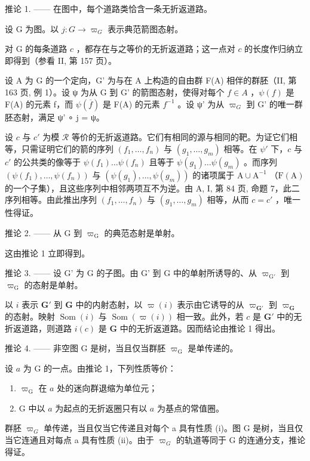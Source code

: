 推论 1. —— 在图中，每个道路类恰含一条无折返道路。

设 G 为图。以 \(j\colon G\to\varpi_{G}\) 表示典范箭图态射。

对 G 的每条道路 \(c\) ，都存在与之等价的无折返道路；这一点对 \(c\) 的长度作归纳立即得到（参看 II, 第 157 页）。

设 A 为 G 的一个定向，G' 为与在 A 上构造的自由群 F(A) 相伴的群胚（II, 第 163 页, 例 1）。设 ψ 为从 G 到 G' 的箭图态射，使得对每个 \(f \in A\) ，\(\psi(f)\) 是 F(A) 的元素 f，而 \(\psi(\overline{f})\) 是 F(A) 的元素 \(f^{-1}\) 。设 ψ' 为从 \(\varpi_{G}\) 到 G' 的唯一群胚态射，满足 ψ' ∘ j = ψ。

设 \(c\) 与 \(c'\) 为模 \(\mathcal{R}\) 等价的无折返道路。它们有相同的源与相同的靶。为证它们相等，只需证明它们的箭的序列 \((f_1, \ldots, f_n)\) 与 \((g_1, \ldots, g_m)\) 相等。在 \(\psi'\) 下，\(c\) 与 \(c'\) 的公共类的像等于 \(\psi(f_1) \ldots \psi(f_n)\) 且等于 \(\psi(g_1) \ldots \psi(g_m)\) 。而序列 \((\psi(f_1), \ldots, \psi(f_n))\) 与 \((\psi(g_1), \ldots, \psi(g_m))\) 的诸项属于 \(\mathrm{A} \cup \mathrm{A}^{-1}\) （\(\mathrm{F(A)}\) 的一个子集），且这些序列中相邻两项互不为逆。由 A, I, 第 84 页, 命题 7，此二序列相等。由此推出序列 \((f_{1},\ldots,f_{n})\) 与 \((g_{1},\ldots,g_{m})\) 相等，从而 \(c=c'\) ，唯一性得证。

推论 2. —— 从 G 到 \(\varpi_{\mathrm{G}}\) 的典范态射是单射。

这由推论 1 立即得到。

推论 3. —— 设 G' 为 G 的子图。由 G' 到 G 中的单射所诱导的、从 \(\varpi_{\mathrm{G}'}\) 到 \(\varpi_{\mathrm{G}}\) 的态射是单射。

以 \(i\) 表示 \(\mathbf{G}'\) 到 \(\mathbf{G}\) 中的内射态射，以 \(\varpi(i)\) 表示由它诱导的从 \(\varpi_{\mathbf{G}'}\) 到 \(\varpi_{\mathbf{G}}\) 的态射。映射 \(\operatorname{Som}(i)\) 与 \(\operatorname{Som}(\varpi(i))\) 相一致。此外，若 \(c\) 是 \(\mathbf{G}'\) 中的无折返道路，则道路 \(i(c)\) 是 \(\mathbf{G}\) 中的无折返道路。因而结论由推论 1 得出。

推论 4. —— 非空图 G 是树，当且仅当群胚 \(\varpi_{\mathrm{G}}\) 是单传递的。

设 \(a\) 为 G 的一点。由推论 1，下列性质等价：

\begin{enumerate}
\def\labelenumi{(\roman{enumi})}
\item
  \(\varpi_{\mathrm{G}}\) 在 \(a\) 处的迷向群退缩为单位元；
\item
  G 中以 \(a\) 为起点的无折返圈只有以 \(a\) 为基点的常值圈。
\end{enumerate}

群胚 \(\varpi_{G}\) 单传递，当且仅当它传递且对每个 a 具有性质 (i)。图 G 是树，当且仅当它连通且对每点 a 具有性质 (ii)。由于 \(\varpi_{G}\) 的轨道等同于 G 的连通分支，推论得证。

